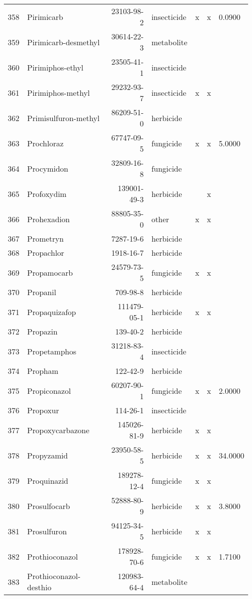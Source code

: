 \begin{longtable}{lp{4cm}rlp{1.3cm}p{1.3cm}p{1.5cm}}
  358 & Pirimicarb & 23103-98-2 & insecticide & x & x & 0.0900 \\ 
  359 & Pirimicarb-desmethyl & 30614-22-3 & metabolite &  &  &  \\ 
  360 & Pirimiphos-ethyl & 23505-41-1 & insecticide &  &  &  \\ 
  361 & Pirimiphos-methyl & 29232-93-7 & insecticide & x & x &  \\ 
  362 & Primisulfuron-methyl & 86209-51-0 & herbicide &  &  &  \\ 
  363 & Prochloraz & 67747-09-5 & fungicide & x & x & 5.0000 \\ 
  364 & Procymidon & 32809-16-8 & fungicide &  &  &  \\ 
  365 & Profoxydim & 139001-49-3 & herbicide &  & x &  \\ 
  366 & Prohexadion & 88805-35-0 & other & x & x &  \\ 
  367 & Prometryn & 7287-19-6 & herbicide &  &  &  \\ 
  368 & Propachlor & 1918-16-7 & herbicide &  &  &  \\ 
  369 & Propamocarb & 24579-73-5 & fungicide & x & x &  \\ 
  370 & Propanil & 709-98-8 & herbicide &  &  &  \\ 
  371 & Propaquizafop & 111479-05-1 & herbicide & x & x &  \\ 
  372 & Propazin & 139-40-2 & herbicide &  &  &  \\ 
  373 & Propetamphos & 31218-83-4 & insecticide &  &  &  \\ 
  374 & Propham & 122-42-9 & herbicide &  &  &  \\ 
  375 & Propiconazol & 60207-90-1 & fungicide & x & x & 2.0000 \\ 
  376 & Propoxur & 114-26-1 & insecticide &  &  &  \\ 
  377 & Propoxycarbazone & 145026-81-9 & herbicide & x & x &  \\ 
  378 & Propyzamid & 23950-58-5 & herbicide & x & x & 34.0000 \\ 
  379 & Proquinazid & 189278-12-4 & fungicide & x & x &  \\ 
  380 & Prosulfocarb & 52888-80-9 & herbicide & x & x & 3.8000 \\ 
  381 & Prosulfuron & 94125-34-5 & herbicide & x & x &  \\ 
  382 & Prothioconazol & 178928-70-6 & fungicide & x & x & 1.7100 \\ 
  383 & Prothioconazol-desthio & 120983-64-4 & metabolite &  &  &  \\ 

\end{longtable}

